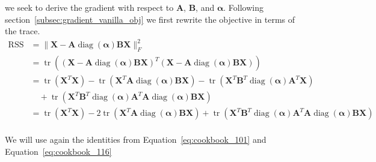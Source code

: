 \documentclass{article}
\begin{document}
we seek to derive the gradient with respect to $\mathbf{A}$, $\mathbf{B}$, and $\boldsymbol{\alpha}$. Following section~\ref{subsec:gradient_vanilla_obj} we first rewrite the objective in terms of the trace.
\begin{equation}
    \label{eq:relaxed_objective_standard_trace}
    \begin{aligned}
        \operatorname{RSS} &= \| \mathbf{{X}} - \mathbf{{A}} \operatorname{diag}(\boldsymbol{\alpha}) \mathbf{B} \mathbf{X} \|_F^2 \\
        &= \operatorname{tr} \left( \left( \mathbf{{X}} - \mathbf{{A}} \operatorname{diag}(\boldsymbol{\alpha}) \mathbf{B} \mathbf{X} \right)^T
            \left( \mathbf{{X}} - \mathbf{{A}} \operatorname{diag}(\boldsymbol{\alpha}) \mathbf{B} \mathbf{X} \right) \right) \\
        &= \operatorname{tr} \left( \mathbf{{X}}^T \mathbf{{X}} \right)
            - \operatorname{tr} \left( \mathbf{{X}}^T \mathbf{{A}} \operatorname{diag}(\boldsymbol{\alpha}) \mathbf{B} \mathbf{X} \right)
            - \operatorname{tr} \left( \mathbf{X}^T \mathbf{B}^T \operatorname{diag}(\boldsymbol{\alpha}) \mathbf{{A}}^T \mathbf{{X}} \right) \\
        &\quad + \operatorname{tr} \left( \mathbf{X}^T \mathbf{B}^T \operatorname{diag}(\boldsymbol{\alpha}) \mathbf{{A}}^T \mathbf{{A}} \operatorname{diag}(\boldsymbol{\alpha}) \mathbf{B} \mathbf{X} \right) \\
        &= \operatorname{tr}\left( \mathbf{X}^T \mathbf{X} \right)
            - 2 \operatorname{tr} \left( \mathbf{{X}}^T \mathbf{{A}} \operatorname{diag}(\boldsymbol{\alpha}) \mathbf{B} \mathbf{X} \right)
            + \operatorname{tr} \left( \mathbf{X}^T \mathbf{B}^T \operatorname{diag}(\boldsymbol{\alpha}) \mathbf{{A}}^T \mathbf{{A}} \operatorname{diag}(\boldsymbol{\alpha}) \mathbf{B} \mathbf{X} \right) \\
    \end{aligned}
\end{equation}

We will use again the identities from Equation~\ref{eq:cookbook_101} and Equation~\ref{eq:cookbook_116}
\end{document}
